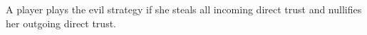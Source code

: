 {}
\begin{definition}
  A player plays the evil strategy if she steals all incoming direct trust and nullifies her outgoing direct trust.
\end{definition}
